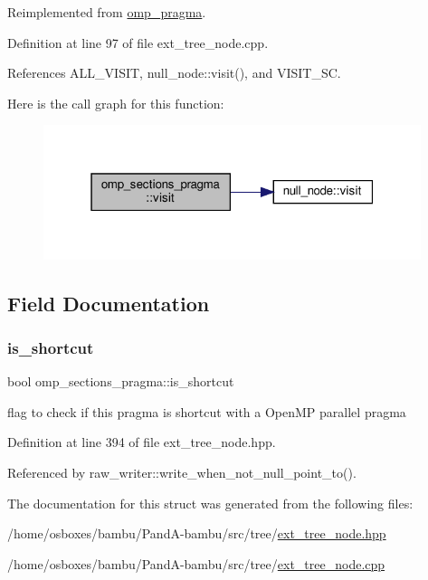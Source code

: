 Reimplemented from \hyperlink{structomp__pragma_a2e2c445528b7e097ae76fa618a9970b5}{omp\+\_\+pragma}.



Definition at line 97 of file ext\+\_\+tree\+\_\+node.\+cpp.



References A\+L\+L\+\_\+\+V\+I\+S\+IT, null\+\_\+node\+::visit(), and V\+I\+S\+I\+T\+\_\+\+SC.

Here is the call graph for this function\+:
\nopagebreak
\begin{figure}[H]
\begin{center}
\leavevmode
\includegraphics[width=313pt]{d0/d1a/structomp__sections__pragma_ae9dcb45b2796afc06a6b4e4233761837_cgraph}
\end{center}
\end{figure}


\subsection{Field Documentation}
\mbox{\label{structomp__sections__pragma_adab9900e4753c9a0bd0665af1449a8fb}} 
\subsubsection{\texorpdfstring{is\+\_\+shortcut}{is\_shortcut}}
{\footnotesize\ttfamily bool omp\+\_\+sections\+\_\+pragma\+::is\+\_\+shortcut}



flag to check if this pragma is shortcut with a Open\+MP parallel pragma 



Definition at line 394 of file ext\+\_\+tree\+\_\+node.\+hpp.



Referenced by raw\+\_\+writer\+::write\+\_\+when\+\_\+not\+\_\+null\+\_\+point\+\_\+to().



The documentation for this struct was generated from the following files\+:\begin{DoxyCompactItemize}
\item 
/home/osboxes/bambu/\+Pand\+A-\/bambu/src/tree/\hyperlink{ext__tree__node_8hpp}{ext\+\_\+tree\+\_\+node.\+hpp}\item 
/home/osboxes/bambu/\+Pand\+A-\/bambu/src/tree/\hyperlink{ext__tree__node_8cpp}{ext\+\_\+tree\+\_\+node.\+cpp}\end{DoxyCompactItemize}
